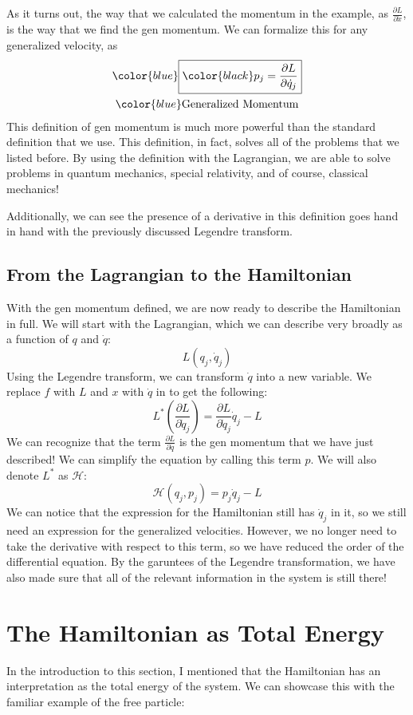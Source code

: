 As it turns out, the way that we calculated the momentum in the example, as $\frac{\partial L}{\partial \dot{x}}$, is the way that we find the \gls{gen momentum}. We can formalize this for any generalized velocity, as
\begin{gather}
    \color{blue}\boxed{\color{black}p_j=\frac{\partial L}{\partial\dot{q}_j}}\\
    \color{blue}\mathrm{Generalized\ Momentum}
\end{gather}
This definition of \gls{gen momentum} is much more powerful than the standard definition that we use. This definition, in fact, solves all of the problems that we listed before. By using the definition with the \gls{Lagrangian}, we are able to solve problems in quantum mechanics, special relativity, and of course, classical mechanics!

Additionally, we can see the presence of a derivative in this definition goes hand in hand with the previously discussed Legendre transform.
\subsection{From the Lagrangian to the Hamiltonian}
With the \gls{gen momentum} defined, we are now ready to describe the \gls{Hamiltonian} in full. We will start with the \gls{Lagrangian}, which we can describe very broadly as a function of $q$ and $\dot{q}$:
$$L(q_j,\dot{q}_j)$$
Using the Legendre transform, we can transform $\dot{q}$ into a new variable. We replace $f$ with $L$ and $x$ with $\dot{q}$ in  to get the following:
$$L^*\left(\frac{\partial L}{\partial \dot{q}_j}\right)=\frac{\partial L}{\partial \dot{q}_j}\dot{q}_j-L$$
We can recognize that the term $\frac{\partial L}{\partial \dot{q}}$ is the \gls{gen momentum} that we have just described! We can simplify the equation by calling this term $p$. We will also denote $L^*$ as $\mathcal{H}$:
$$\mathcal{H}(q_j,p_j)=p_j\dot{q}_j-L$$
We can notice that the expression for the \gls{Hamiltonian} still has $\dot{q}_j$ in it, so we still need an expression for the generalized velocities. However, we no longer need to take the derivative with respect to this term, so we have reduced the order of the differential equation. By the garuntees of the Legendre transformation, we have also made sure that all of the relevant information in the system is still there!

\section{The Hamiltonian as Total Energy}
In the introduction to this section, I mentioned that the \gls{Hamiltonian} has an interpretation as the total energy of the system. We can showcase this with the familiar example of the free particle:

